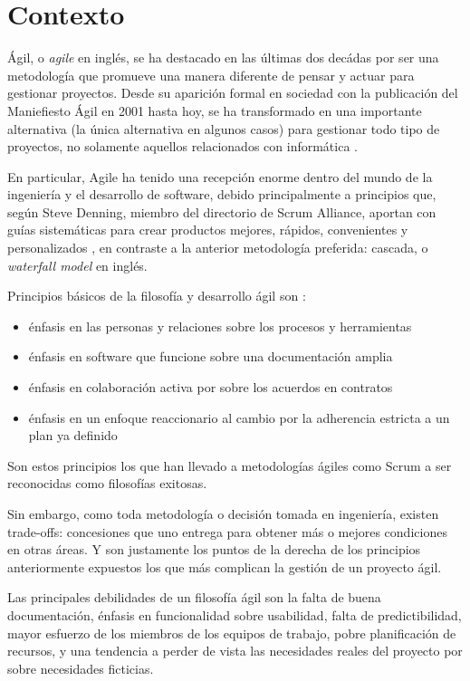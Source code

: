 \section{Contexto}

Ágil, o \textit{agile} en inglés, se ha destacado en las últimas dos decádas por ser una 
metodología que promueve una manera diferente de pensar y actuar para gestionar 
proyectos. Desde su aparición formal en sociedad con la publicación del Maniefiesto
Ágil en 2001 hasta hoy, se ha transformado en una importante alternativa 
(la única alternativa en algunos casos) para gestionar todo tipo de proyectos,
no solamente aquellos relacionados con informática \cite{scrum_report_1}.

En particular, Agile ha tenido una recepción enorme dentro del mundo de la ingeniería
y el desarrollo de software, debido principalmente a principios que, según 
Steve Denning, miembro del directorio de Scrum Alliance, aportan con guías
sistemáticas para crear productos mejores, rápidos, convenientes y personalizados \cite{denning_2015},
en contraste a la anterior metodología preferida: cascada, o \textit{waterfall model}
en inglés.


Principios básicos de la filosofía y desarrollo ágil son \cite{beck2001agile}:

\begin{itemize}
  \item énfasis en las personas y relaciones sobre los  procesos y herramientas
  \item énfasis en software que funcione sobre una documentación amplia
  \item énfasis en colaboración activa por sobre los acuerdos en contratos
  \item énfasis en un enfoque reaccionario al cambio por la adherencia estricta 
  a un plan ya definido
\end{itemize}


Son estos principios los que han llevado a metodologías ágiles como Scrum a ser
reconocidas como filosofías exitosas\cite{scrum_report_1}.

Sin embargo, como toda metodología o decisión tomada en ingeniería, existen 
trade-offs: concesiones que uno entrega para obtener más o mejores condiciones
en otras  áreas. Y son justamente los puntos de la  derecha de los principios 
anteriormente expuestos los que más complican la gestión de un proyecto ágil.

Las principales debilidades de un filosofía ágil son la falta de buena documentación,
énfasis en funcionalidad sobre usabilidad\cite{satria_systematic}, falta de predictibilidad,
mayor esfuerzo de los miembros de los equipos de trabajo, pobre planificación de
recursos\cite{disadvantages_agile}, y una tendencia a perder de vista las necesidades
reales del proyecto por sobre necesidades ficticias.

